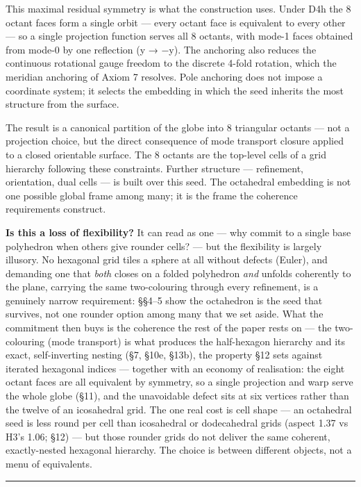 \documentclass[
  11pt,
  a4paper,
]{article}
\begin{document}
This maximal residual symmetry is what the construction uses. Under D4h
the 8 octant faces form a single orbit --- every octant face is
equivalent to every other --- so a single projection function serves all
8 octants, with mode-1 faces obtained from mode-0 by one reflection (y →
−y). The anchoring also reduces the continuous rotational gauge freedom
to the discrete 4-fold rotation, which the meridian anchoring of Axiom 7
resolves. Pole anchoring does not impose a coordinate system; it selects
the embedding in which the seed inherits the most structure from the
surface.

The result is a canonical partition of the globe into 8 triangular
octants --- not a projection choice, but the direct consequence of mode
transport closure applied to a closed orientable surface. The 8 octants
are the top-level cells of a grid hierarchy following these constraints.
Further structure --- refinement, orientation, dual cells --- is built
over this seed. The octahedral embedding is not one possible global
frame among many; it is the frame the coherence requirements construct.

\textbf{Is this a loss of flexibility?} It can read as one --- why
commit to a single base polyhedron when others give rounder cells? ---
but the flexibility is largely illusory. No hexagonal grid tiles a
sphere at all without defects (Euler), and demanding one that
\emph{both} closes on a folded polyhedron \emph{and} unfolds coherently
to the plane, carrying the same two-colouring through every refinement,
is a genuinely narrow requirement: §§4--5 show the octahedron is the
seed that survives, not one rounder option among many that we set aside.
What the commitment then buys is the coherence the rest of the paper
rests on --- the two-colouring (mode transport) is what produces the
half-hexagon hierarchy and its exact, self-inverting nesting (§7, §10e,
§13b), the property §12 sets against iterated hexagonal indices ---
together with an economy of realisation: the eight octant faces are all
equivalent by symmetry, so a single projection and warp serve the whole
globe (§11), and the unavoidable defect sits at six vertices rather than
the twelve of an icosahedral grid. The one real cost is cell shape ---
an octahedral seed is less round per cell than icosahedral or
dodecahedral grids (aspect 1.37 vs H3's 1.06; §12) --- but those rounder
grids do not deliver the same coherent, exactly-nested hexagonal
hierarchy. The choice is between different objects, not a menu of
equivalents.

\begin{center}\rule{0.5\linewidth}{0.5pt}\end{center}
\end{document}
